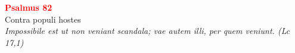 


\def\greinitialformat#1{%
{\fontsize{39}{39}\selectfont #1}%
}




\vspace{0.3cm}
\begin{center}
 \textcolor{red}{\large \bf Psalmus 82}\\
Contra populi hostes\\
\textit{\small Impossibile est ut non veniant scandala; vae autem illi, per quem veniunt. (Lc 17,1)}
\end{center}
